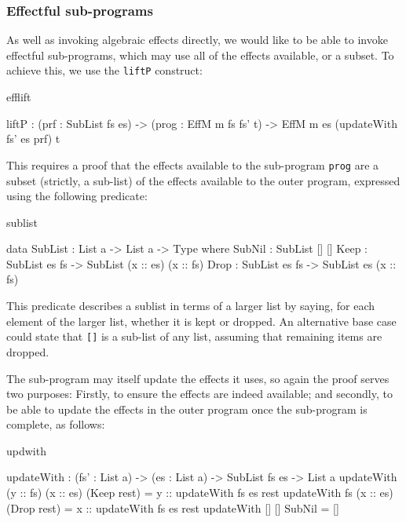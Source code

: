 \subsubsection{Effectful sub-programs}

As well as invoking algebraic effects directly, we would like to be able to
invoke effectful sub-programs, which may use all of the effects available, or
a subset. To achieve this, we use the \texttt{liftP} construct:

\begin{SaveVerbatim}{efflift}

liftP : (prf : SubList fs es) ->
        (prog : EffM m fs fs' t) -> 
        EffM m es (updateWith fs' es prf) t

\end{SaveVerbatim}

\noindent
This requires a proof that the effects available to the sub-program \texttt{prog}
are a subset (strictly, a sub-list) of the effects available to the outer program,
expressed using the following predicate:

\begin{SaveVerbatim}{sublist}

data SubList : List a -> List a -> Type where
     SubNil : SubList [] []
     Keep   : SubList es fs -> 
              SubList (x :: es) (x :: fs)
     Drop   : SubList es fs -> 
              SubList es (x :: fs)

\end{SaveVerbatim}

\noindent
This predicate describes a sublist in terms of a larger list by saying, for each
element of the larger list, whether it is kept or dropped. An alternative
base case could state that \texttt{[]} is a sub-list of any list, assuming
that remaining items are dropped.

The sub-program may itself update the effects it uses, so again the proof serves
two purposes: Firstly, to ensure the effects are indeed available; and secondly,
to be able to update the effects in the outer program once the sub-program is
complete, as follows:

\begin{SaveVerbatim}{updwith}

updateWith : (fs' : List a) -> (es : List a) ->
             SubList fs es -> List a
updateWith (y :: fs) (x :: es) (Keep rest) 
           = y :: updateWith fs es rest
updateWith fs        (x :: es) (Drop rest) 
           = x :: updateWith fs es rest
updateWith []        []        SubNil      = []

\end{SaveVerbatim}

